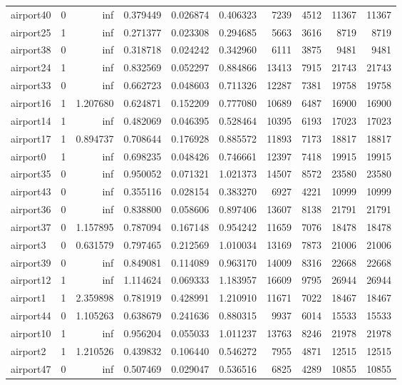 \begin{longtable}{|l|r|r|r|r|r|r|r|r|r|}
airport40 & 0 & inf & 0.379449 & 0.026874 & 0.406323 & 7239 & 4512 & 11367 & 11367 \\
airport25 & 1 & inf & 0.271377 & 0.023308 & 0.294685 & 5663 & 3616 & 8719 & 8719 \\
airport38 & 0 & inf & 0.318718 & 0.024242 & 0.342960 & 6111 & 3875 & 9481 & 9481 \\
airport24 & 1 & inf & 0.832569 & 0.052297 & 0.884866 & 13413 & 7915 & 21743 & 21743 \\
airport33 & 0 & inf & 0.662723 & 0.048603 & 0.711326 & 12287 & 7381 & 19758 & 19758 \\
airport16 & 1 & 1.207680 & 0.624871 & 0.152209 & 0.777080 & 10689 & 6487 & 16900 & 16900 \\
airport14 & 1 & inf & 0.482069 & 0.046395 & 0.528464 & 10395 & 6193 & 17023 & 17023 \\
airport17 & 1 & 0.894737 & 0.708644 & 0.176928 & 0.885572 & 11893 & 7173 & 18817 & 18817 \\
airport0 & 1 & inf & 0.698235 & 0.048426 & 0.746661 & 12397 & 7418 & 19915 & 19915 \\
airport35 & 0 & inf & 0.950052 & 0.071321 & 1.021373 & 14507 & 8572 & 23580 & 23580 \\
airport43 & 0 & inf & 0.355116 & 0.028154 & 0.383270 & 6927 & 4221 & 10999 & 10999 \\
airport36 & 0 & inf & 0.838800 & 0.058606 & 0.897406 & 13607 & 8138 & 21791 & 21791 \\
airport37 & 0 & 1.157895 & 0.787094 & 0.167148 & 0.954242 & 11659 & 7076 & 18478 & 18478 \\
airport3 & 0 & 0.631579 & 0.797465 & 0.212569 & 1.010034 & 13169 & 7873 & 21006 & 21006 \\
airport39 & 0 & inf & 0.849081 & 0.114089 & 0.963170 & 14009 & 8316 & 22668 & 22668 \\
airport12 & 1 & inf & 1.114624 & 0.069333 & 1.183957 & 16609 & 9795 & 26944 & 26944 \\
airport1 & 1 & 2.359898 & 0.781919 & 0.428991 & 1.210910 & 11671 & 7022 & 18467 & 18467 \\
airport44 & 0 & 1.105263 & 0.638679 & 0.241636 & 0.880315 & 9937 & 6014 & 15533 & 15533 \\
airport10 & 1 & inf & 0.956204 & 0.055033 & 1.011237 & 13763 & 8246 & 21978 & 21978 \\
airport2 & 1 & 1.210526 & 0.439832 & 0.106440 & 0.546272 & 7955 & 4871 & 12515 & 12515 \\
airport47 & 0 & inf & 0.507469 & 0.029047 & 0.536516 & 6825 & 4289 & 10855 & 10855 \\

\end{longtable}
